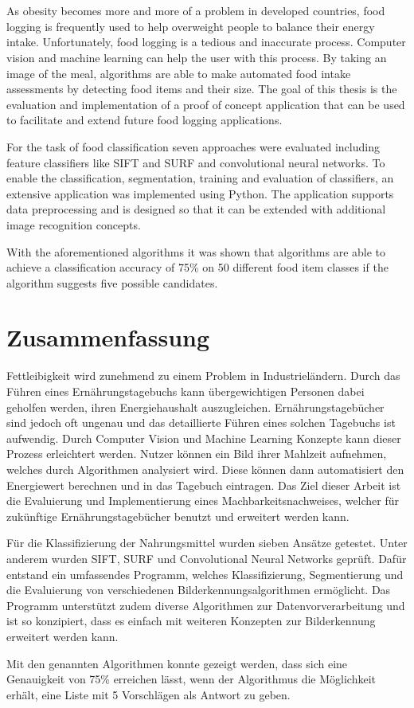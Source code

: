 \chapter{\abstractname}
As obesity becomes more and more of a problem in developed countries, food logging is frequently used to help overweight people to balance their energy intake. Unfortunately, food logging is a tedious and inaccurate process. Computer vision and machine learning can help the user with this process. By taking an image of the meal, algorithms are able to make automated food intake assessments by detecting food items and their size. The goal of this thesis is the evaluation and implementation of a proof of concept application that can be used to facilitate and extend future food logging applications.

For the task of food classification seven approaches were evaluated including feature classifiers like SIFT and SURF and convolutional neural networks. To enable the classification, segmentation, training and evaluation of classifiers, an extensive application was implemented using Python. The application supports data preprocessing and is designed so that it can be extended with additional image recognition concepts.

With the aforementioned algorithms it was shown that algorithms are able to achieve a classification accuracy of 75\% on 50 different food item classes if the algorithm suggests five possible candidates.


\chapter{Zusammenfassung}
Fettleibigkeit wird zunehmend zu einem Problem in Industrieländern. Durch das Führen eines Ernährungstagebuchs kann übergewichtigen Personen dabei geholfen werden, ihren Energiehaushalt auszugleichen. Ernährungstagebücher sind jedoch oft ungenau und das detaillierte Führen eines solchen Tagebuchs ist aufwendig. Durch Computer Vision und Machine Learning Konzepte kann dieser Prozess erleichtert werden. Nutzer können ein Bild ihrer Mahlzeit aufnehmen, welches durch Algorithmen analysiert wird. Diese können dann automatisiert den Energiewert berechnen und in das Tagebuch eintragen. Das Ziel dieser Arbeit ist die Evaluierung und Implementierung eines Machbarkeitsnachweises, welcher für zukünftige Ernährungstagebücher benutzt und erweitert werden kann.

Für die Klassifizierung der Nahrungsmittel wurden sieben Ansätze getestet. Unter anderem wurden SIFT, SURF und Convolutional Neural Networks geprüft. Dafür entstand ein umfassendes Programm, welches Klassifizierung, Segmentierung und die Evaluierung von verschiedenen Bilderkennungsalgorithmen ermöglicht. Das Programm unterstützt zudem diverse Algorithmen zur Datenvorverarbeitung und ist so konzipiert, dass es einfach mit weiteren Konzepten zur Bilderkennung erweitert werden kann. 

Mit den genannten Algorithmen konnte gezeigt werden, dass sich eine Genauigkeit von 75\% erreichen lässt, wenn der Algorithmus die Möglichkeit erhält, eine Liste mit 5 Vorschlägen als Antwort zu geben.






